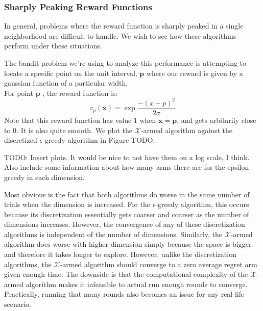 \subsubsection{Sharply Peaking Reward Functions}
In general, problems where the reward function is sharply peaked in a single neighborhood
are difficult to handle. We wish to see how these algorithms perform under these situations.

The bandit problem we're using to analyze this performance is attempting to locate a specific
point on the unit interval, $\mathbf{p}$ where our reward is given by a gaussian function of a particular width.\\
For point  $\mathbf{p}$ , the reward function is:
\[
	r_p(\mathbf{x}) = \exp{\frac{-(x-p)^2}{2\sigma}}
\]
Note that this reward function has value 1 when
$\mathbf{x} = \mathbf{p}$, and gets arbitarily close to 0.  It is
also quite smooth.  We plot the
$\mathcal{X}$-armed algorithm against the discretized $\epsilon$-greedy
algorithm in Figure TODO.

TODO: Insert plots.  It would be nice to not have them on a log
scale, I think.  Also include some information about how many arms there
are for the epsilon greedy in each dimension.

Most obvious is the fact that both algorithms do worse in the same number
of trials when the dimension is increased.  For the $\epsilon$-greedy
algorithm, this occurs because its discretization essentially gets
coarser and coarser as the number of dimensions increases.  However,
the convergence of any of these discretization algorithms is independent
of the number of dimensions.  Similarly,
the $\mathcal{X}$-armed algorithm does worse with higher dimension simply
because the space is bigger and therefore it takes longer to explore.
However, unlike the discretization algorithms, the $\mathcal{X}$-armed
algorithm should converge to a zero average regret arm given enough
time.  The downside is that the computational complexity of the
$\mathcal{X}$-armed algorithm makes it infeasible to actual run enough
rounds to converge.  Practically, running that many rounds also becomes
an issue for any real-life scenario. 

